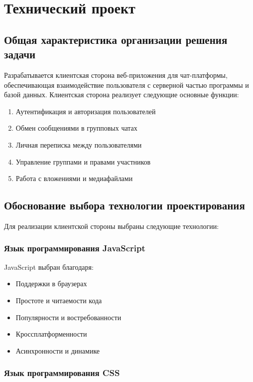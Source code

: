 \section{Технический проект}
\subsection{Общая характеристика организации решения задачи}

Разрабатывается клиентская сторона веб-приложения для чат-платформы, обеспечивающая взаимодействие пользователя с серверной частью программы и базой данных. Клиентская сторона реализует следующие основные функции:
\begin{enumerate}
	\item Аутентификация и авторизация пользователей
	\item Обмен сообщениями в групповых чатах
	\item Личная переписка между пользователями
	\item Управление группами и правами участников
	\item Работа с вложениями и медиафайлами
\end{enumerate}

\subsection{Обоснование выбора технологии проектирования}

Для реализации клиентской стороны выбраны следующие технологии:

\subsubsection{Язык программирования JavaScript}

JavaScript выбран благодаря:
\begin{itemize}
	\item Поддержки в браузерах
	\item Простоте и читаемости кода
	\item Популярности и востребованности
	\item Кроссплатформенности
	\item Асинхронности и динамике
\end{itemize}

\subsubsection{Язык программирования CSS}

